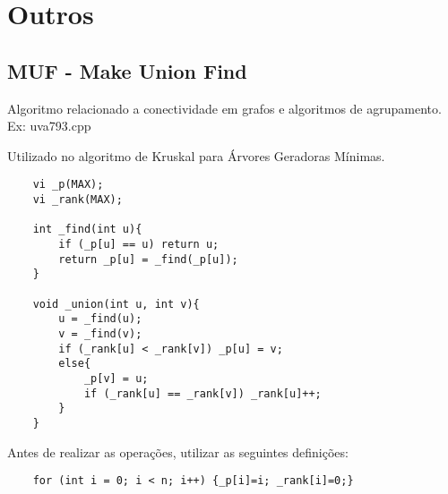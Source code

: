 \section{Outros}

\subsection{MUF - Make Union Find}

Algoritmo relacionado a conectividade em grafos e algoritmos de agrupamento. Ex: uva793.cpp
\par Utilizado no algoritmo de Kruskal para Árvores Geradoras Mínimas.
\begin{verbatim}
    vi _p(MAX);
    vi _rank(MAX);

    int _find(int u){
        if (_p[u] == u) return u;
        return _p[u] = _find(_p[u]);
    }

    void _union(int u, int v){
        u = _find(u);
        v = _find(v);
        if (_rank[u] < _rank[v]) _p[u] = v;
        else{
            _p[v] = u;
            if (_rank[u] == _rank[v]) _rank[u]++;
        }
    }
\end{verbatim}

\par Antes de realizar as operações, utilizar as seguintes definições:
\begin{verbatim}
    for (int i = 0; i < n; i++) {_p[i]=i; _rank[i]=0;}
\end{verbatim}
